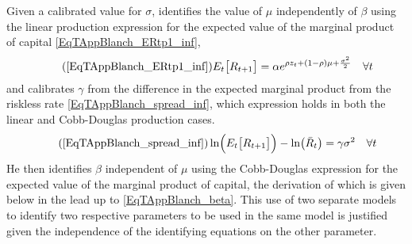 \documentclass[letterpaper,12pt]{article}
\theoremstyle{definition}
\begin{document}
    Given a calibrated value for $\sigma$, \citet[p. 1213]{Blanchard:2019} identifies the value of $\mu$ independently of $\beta$ using the linear production expression for the expected value of the marginal product of capital \eqref{EqTAppBlanch_ERtp1_inf},
    \begin{equation}\tag{\ref{EqTAppBlanch_ERtp1_inf}}
        E_t\bigl[R_{t+1}\bigr] = \alpha e^{\rho z_t + (1-\rho)\mu + \frac{\sigma^2}{2}} \quad\forall t
      \end{equation}
    and calibrates $\gamma$ from the difference in the expected marginal product from the riskless rate \eqref{EqTAppBlanch_spread_inf}, which expression holds in both the linear and Cobb-Douglas production cases.
    \begin{equation}\tag{\ref{EqTAppBlanch_spread_inf}}
      \ln\Bigl(E_t\bigl[R_{t+1}\bigr]\Bigr) - \ln\bigl(\bar{R}_t\bigr) = \gamma\sigma^2 \quad\forall t
    \end{equation}
    He then identifies $\beta$ independent of $\mu$ using the Cobb-Douglas expression for the expected value of the marginal product of capital, the derivation of which is given below in the lead up to \eqref{EqTAppBlanch_beta}. This use of two separate models to identify two respective parameters to be used in the same model is justified given the independence of the identifying equations on the other parameter.
\end{document}
